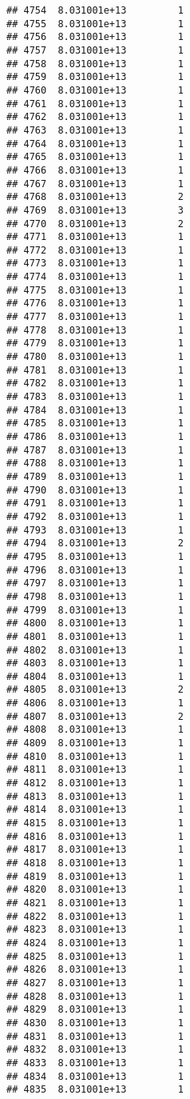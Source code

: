 \documentclass[
]{article}
\begin{document}
\begin{verbatim}
## 4754  8.031001e+13         1
## 4755  8.031001e+13         1
## 4756  8.031001e+13         1
## 4757  8.031001e+13         1
## 4758  8.031001e+13         1
## 4759  8.031001e+13         1
## 4760  8.031001e+13         1
## 4761  8.031001e+13         1
## 4762  8.031001e+13         1
## 4763  8.031001e+13         1
## 4764  8.031001e+13         1
## 4765  8.031001e+13         1
## 4766  8.031001e+13         1
## 4767  8.031001e+13         1
## 4768  8.031001e+13         2
## 4769  8.031001e+13         3
## 4770  8.031001e+13         2
## 4771  8.031001e+13         1
## 4772  8.031001e+13         1
## 4773  8.031001e+13         1
## 4774  8.031001e+13         1
## 4775  8.031001e+13         1
## 4776  8.031001e+13         1
## 4777  8.031001e+13         1
## 4778  8.031001e+13         1
## 4779  8.031001e+13         1
## 4780  8.031001e+13         1
## 4781  8.031001e+13         1
## 4782  8.031001e+13         1
## 4783  8.031001e+13         1
## 4784  8.031001e+13         1
## 4785  8.031001e+13         1
## 4786  8.031001e+13         1
## 4787  8.031001e+13         1
## 4788  8.031001e+13         1
## 4789  8.031001e+13         1
## 4790  8.031001e+13         1
## 4791  8.031001e+13         1
## 4792  8.031001e+13         1
## 4793  8.031001e+13         1
## 4794  8.031001e+13         2
## 4795  8.031001e+13         1
## 4796  8.031001e+13         1
## 4797  8.031001e+13         1
## 4798  8.031001e+13         1
## 4799  8.031001e+13         1
## 4800  8.031001e+13         1
## 4801  8.031001e+13         1
## 4802  8.031001e+13         1
## 4803  8.031001e+13         1
## 4804  8.031001e+13         1
## 4805  8.031001e+13         2
## 4806  8.031001e+13         1
## 4807  8.031001e+13         2
## 4808  8.031001e+13         1
## 4809  8.031001e+13         1
## 4810  8.031001e+13         1
## 4811  8.031001e+13         1
## 4812  8.031001e+13         1
## 4813  8.031001e+13         1
## 4814  8.031001e+13         1
## 4815  8.031001e+13         1
## 4816  8.031001e+13         1
## 4817  8.031001e+13         1
## 4818  8.031001e+13         1
## 4819  8.031001e+13         1
## 4820  8.031001e+13         1
## 4821  8.031001e+13         1
## 4822  8.031001e+13         1
## 4823  8.031001e+13         1
## 4824  8.031001e+13         1
## 4825  8.031001e+13         1
## 4826  8.031001e+13         1
## 4827  8.031001e+13         1
## 4828  8.031001e+13         1
## 4829  8.031001e+13         1
## 4830  8.031001e+13         1
## 4831  8.031001e+13         1
## 4832  8.031001e+13         1
## 4833  8.031001e+13         1
## 4834  8.031001e+13         1
## 4835  8.031001e+13         1

\end{verbatim}
\end{document}
